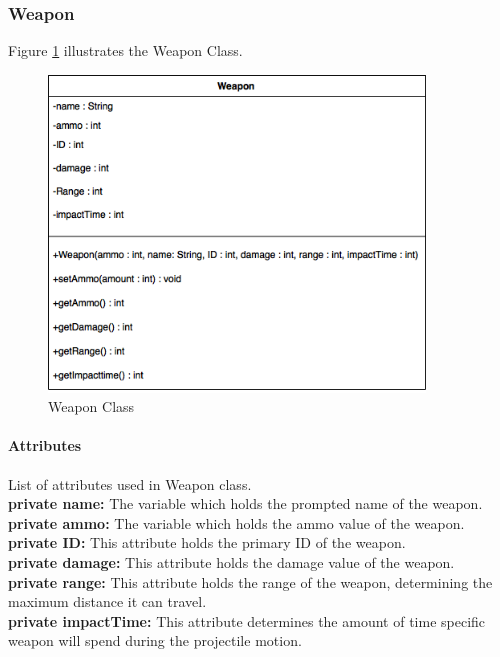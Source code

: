 \documentclass[12pt]{article} %
\begin{document}


\subsubsection{Weapon} %

Figure \ref{fig:weapon} illustrates the Weapon Class.
\begin{figure}[h!]
   \centering
   \vspace{10pt}%
   \includegraphics[width=10cm]{weapon.png}
   \caption{Weapon Class}
   \label{fig:weapon}
\end{figure}

\paragraph{Attributes\\}

List of attributes used in Weapon class.\\
\textbf{private name:} The variable which holds the prompted name of the weapon.\\
\textbf{private ammo:} The variable which holds the ammo value of the weapon.\\
\textbf{private ID:} This attribute holds the primary ID of the weapon.\\
\textbf{private damage:} This attribute holds the damage value of the weapon.\\
\textbf{private range:} This attribute holds the range of the weapon, determining the maximum distance it can travel. \\
\textbf{private impactTime:} This attribute determines the amount of time specific weapon will spend during the projectile motion. \\
\end{document}

